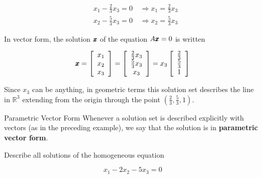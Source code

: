 \begin{solution}
\[
\begin{aligned}
& x_1-\frac{2}{3} x_3=0 \quad \Longrightarrow x_1=\frac{2}{3} x_3 \\
& x_2-\frac{5}{3} x_3=0 \quad \Longrightarrow x_2=\frac{5}{3} x_3
\end{aligned}
\]


In vector form, the solution $\pmb{x}$ of the equation $A \pmb{x}=0$ is written

\[
\pmb{x}=\left[\begin{array}{l}
x_1 \\
x_2 \\
x_3
\end{array}\right]=\left[\begin{array}{c}
\frac{2}{3} x_3 \\
\frac{5}{3} x_3 \\
x_3
\end{array}\right]=x_3\left[\begin{array}{c}
\frac{2}{3} \\
\frac{5}{3} \\
1
\end{array}\right]
\]


Since $x_3$ can be anything, in geometric terms this solution set describes the line in $\mathbb{R}^3$ extending from the origin through the point $\left(\frac{2}{3}, \frac{5}{3}, 1\right)$.
\end{solution}


\begin{custombox}{Parametric Vector Form}
    Whenever a solution set is described explicitly with vectors (as in the preceding example), we say that the solution is in \textbf{parametric vector form}.
\end{custombox}

\begin{example} Describe all solutions of the homogeneous equation


\[
    x_1-2 x_2-5 x_3=0
\]

\end{example}

